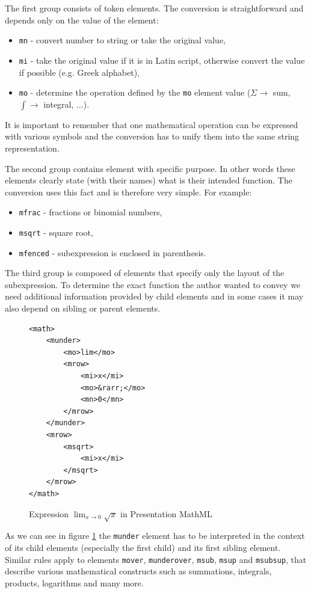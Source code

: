 \documentclass[11pt,oneside,final]{fithesis2}
\begin{document}
The first group consists of token elements. The conversion is straightforward and depends only on the value of the element:
\begin{itemize}
\item \texttt{mn} - convert number to string or take the original value,
\item \texttt{mi} - take the original value if it is in Latin script, otherwise convert the value if possible (e.g. Greek alphabet),
\item \texttt{mo} - determine the operation defined by the \texttt{mo} element value ($\Sigma \rightarrow$ sum, $\int \rightarrow$ integral, $\ldots$).
\end{itemize}
It is important to remember that one mathematical operation can be expressed with various symbols and the conversion has to unify them into the same string representation.

The second group contains element with specific purpose. In other words these elements clearly state (with their names) what is their intended function. The conversion uses this fact and is therefore very simple. For example:
\begin{itemize}
\item \texttt{mfrac} - fractions or binomial numbers,
\item \texttt{msqrt} - square root,
\item \texttt{mfenced} - subexpression is enclosed in parenthesis.
\end{itemize}

The third group is composed of elements that specify only the layout of the subexpression. To determine the exact function the author wanted to convey we need additional information provided by child elements and in some cases it may also depend on sibling or parent elements. 
\begin{figure}[!ht]
\lstset{language=XML,frame=lines}
\begin{lstlisting}
<math>
	<munder>
		<mo>lim</mo>
		<mrow>
			<mi>x</mi>
			<mo>&rarr;</mo>
			<mn>0</mn>
		</mrow>		
	</munder>
	<mrow>
		<msqrt>
			<mi>x</mi>
		</msqrt>
	</mrow>
</math>
\end{lstlisting}
\caption{Expression $\lim_{x \to 0}\sqrt{x}$ in Presentation MathML}
\label{fig:mathmllimit}
\end{figure}

As we can see in figure \ref{fig:mathmllimit} the \texttt{munder} element has to be interpreted in the context of its child elements (especially the first child) and its first sibling element. Similar rules apply to elements \texttt{mover}, \texttt{munderover}, \texttt{msub}, \texttt{msup} and \texttt{msubsup}, that describe various mathematical constructs such as summations, integrals, products, logarithms and many more.
\end{document}
